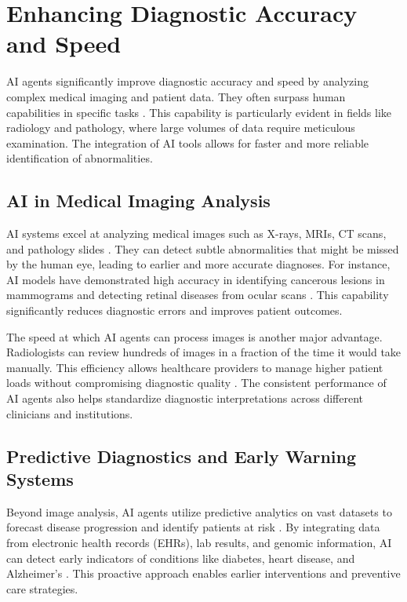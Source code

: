 \documentclass[12pt,a4paper]{article}
\begin{document}
\section{Enhancing Diagnostic Accuracy and Speed}
AI agents significantly improve diagnostic accuracy and speed by analyzing complex medical imaging and patient data. They often surpass human capabilities in specific tasks \cite{esteva2017dermatologist}. This capability is particularly evident in fields like radiology and pathology, where large volumes of data require meticulous examination. The integration of AI tools allows for faster and more reliable identification of abnormalities.

\subsection{AI in Medical Imaging Analysis}
AI systems excel at analyzing medical images such as X-rays, MRIs, CT scans, and pathology slides \cite{sgu.edu}. They can detect subtle abnormalities that might be missed by the human eye, leading to earlier and more accurate diagnoses. For instance, AI models have demonstrated high accuracy in identifying cancerous lesions in mammograms and detecting retinal diseases from ocular scans \cite{rajpurkar2017chexnet}. This capability significantly reduces diagnostic errors and improves patient outcomes.

The speed at which AI agents can process images is another major advantage. Radiologists can review hundreds of images in a fraction of the time it would take manually. This efficiency allows healthcare providers to manage higher patient loads without compromising diagnostic quality \cite{mckinney2020international}. The consistent performance of AI agents also helps standardize diagnostic interpretations across different clinicians and institutions.

\subsection{Predictive Diagnostics and Early Warning Systems}
Beyond image analysis, AI agents utilize predictive analytics on vast datasets to forecast disease progression and identify patients at risk \cite{coursera.org}. By integrating data from electronic health records (EHRs), lab results, and genomic information, AI can detect early indicators of conditions like diabetes, heart disease, and Alzheimer's \cite{rapidinnovation.io}. This proactive approach enables earlier interventions and preventive care strategies.
\end{document}
